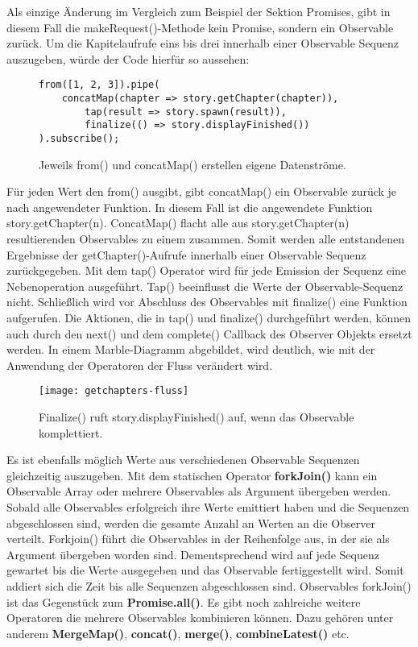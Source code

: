 \noindent
Als einzige Änderung im Vergleich zum Beispiel der Sektion Promises, gibt in diesem Fall die makeRequest()-Methode kein Promise, sondern ein Observable zurück. Um die Kapitelaufrufe eins bis drei innerhalb einer Observable Sequenz auszugeben, würde der Code hierfür so aussehen:

\begin{figure}[H]
\begin{lstlisting}[basicstyle=\small]
from([1, 2, 3]).pipe(
    concatMap(chapter => story.getChapter(chapter)),
        tap(result => story.spawn(result)),
        finalize(() => story.displayFinished())
).subscribe();
\end{lstlisting}
\caption{Jeweils from() und concatMap() erstellen eigene Datenströme.}
\end{figure}

\noindent
Für jeden Wert den from() ausgibt, gibt concatMap() ein Observable zurück je nach angewendeter Funktion. In diesem Fall ist die angewendete Funktion story.getChapter(n). ConcatMap() flacht alle aus story.getChapter(n) resultierenden Observables zu einem zusammen. Somit werden alle entstandenen Ergebnisse der getChapter()-Aufrufe innerhalb einer Observable Sequenz zurückgegeben. Mit dem tap() Operator wird für jede Emission der Sequenz eine Nebenoperation ausgeführt. Tap() beeinflusst die Werte der Observable-Sequenz nicht. Schließlich wird vor Abschluss des Observables mit finalize() eine Funktion aufgerufen. Die Aktionen, die in tap() und finalize() durchgeführt werden, können auch durch den next() und dem complete() Callback des Observer Objekts ersetzt werden. In einem Marble-Diagramm abgebildet, wird deutlich, wie mit der Anwendung der Operatoren der Fluss verändert wird.

\begin{figure}[H]
\centering
\texttt{[image: getchapters-fluss]}
\caption{Finalize() ruft story.displayFinished() auf, wenn das Observable komplettiert.}
\end{figure}


\noindent
Es ist ebenfalls möglich Werte aus verschiedenen Observable Sequenzen gleichzeitig auszugeben. Mit dem statischen Operator \textbf{forkJoin()} kann ein Observable Array oder mehrere Observables als Argument übergeben werden. Sobald alle Observables erfolgreich ihre Werte emittiert haben und die Sequenzen abgeschlossen sind, werden die gesamte Anzahl an Werten an die Observer verteilt. Forkjoin() führt die Observables in der Reihenfolge aus, in der sie als Argument übergeben worden sind. Dementsprechend wird auf jede Sequenz gewartet bis die Werte ausgegeben und das Observable fertiggestellt wird. Somit addiert sich die Zeit bis alle Sequenzen abgeschlossen sind. Observables forkJoin() ist das Gegenstück zum \textbf{Promise.all()}. Es gibt noch zahlreiche weitere Operatoren die mehrere Observables kombinieren können. Dazu gehören unter anderem \textbf{MergeMap()}, \textbf{concat()}, \textbf{merge()}, \textbf{combineLatest()} etc.\\


